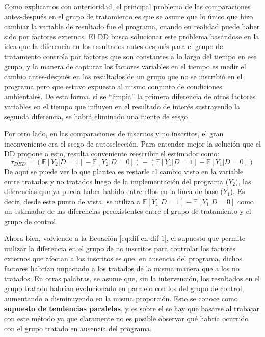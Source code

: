 \documentclass[../../main.tex]{subfiles}
\begin{document}
Como explicamos con anterioridad, el principal problema de las comparaciones antes-después en el grupo de tratamiento es que se asume que lo único que hizo cambiar la variable de resultado fue el programa, cuando en realidad puede haber sido por factores externos. El DD busca solucionar este problema basándose en la idea que la diferencia en los resultados antes-después para el grupo de tratamiento controla por factores que son constantes a lo largo del tiempo en ese grupo, y la manera de capturar los factores variables en el tiempo es medir el cambio antes-después en los resultados de un grupo que no se inscribió en el programa pero que estuvo expuesto al mismo conjunto de condiciones ambientales. De esta forma, si se ``limpia'' la primera diferencia de otros factores variables en el tiempo que influyen en el resultado de interés sustrayendo la segunda diferencia, se habrá eliminado una fuente de sesgo \cite{gertler-2016}.

Por otro lado, en las comparaciones de inscritos y no inscritos, el gran inconveniente era el sesgo de autoselección. Para entender mejor la solución que el DD propone a esto, resulta conveniente reescribir el estimador como:
\begin{equation}
    \tau_{DED} = 
        \left(
            \mathbb{E}\left[Y_2|D=1\right] - \mathbb{E}\left[Y_2|D=0\right]
        \right) -
        \left(
            \mathbb{E}\left[Y_1|D=1\right] - \mathbb{E}\left[Y_1|D=0\right]
        \right)
        \label{eq:dif-en-dif-2}
\end{equation}
De aquí se puede ver lo que plantea es restarle al cambio visto en la variable entre tratados y no tratados luego de la implementación del programa (\(Y_2\)), las diferencias que ya pueda haber habido entre ellos en la línea de base (\(Y_1\)). Es decir, desde este punto de vista, se utiliza a \(\mathbb{E}\left[Y_1|D=1\right] - \mathbb{E}\left[Y_1|D=0\right]\) como un estimador de las diferencias preexistentes entre el grupo de tratamiento y el grupo de control.

Ahora bien, volviendo a la Ecuación \ref{eq:dif-en-dif-1}, el supuesto que permite utilizar la diferencia en el grupo de no inscritos para controlar los factores externos que afectan a los inscritos es que, en ausencia del programa, dichos factores habrían impactado a los tratados de la misma manera que a los no tratados. En otras palabras, se asume que, sin la intervención, los resultados en el grupo tratado habrían evolucionado en paralelo con los del grupo de control, aumentando o disminuyendo en la misma proporción. Esto se conoce como \textbf{supuesto de tendencias paralelas}, y es sobre el se hay que basarse al trabajar con este método ya que claramente no es posible observar qué habría ocurrido con el grupo tratado en ausencia del programa.
\end{document}
